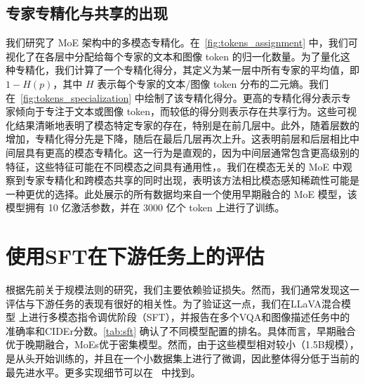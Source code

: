 \begin{figure}[t!]
    \begin{minipage}[t]{0.58\textwidth}
        
    \end{minipage}
    \hfill
    \begin{minipage}[t]{0.38\textwidth}
        
    \end{minipage}
\end{figure}
\subsection{专家专精化与共享的出现}  
\label{sec:specialization}  
我们研究了 MoE 架构中的多模态专精化。在~\cref{fig:tokens_assignment} 中，我们可视化了在各层中分配给每个专家的文本和图像 token 的归一化数量。为了量化这种专精化，我们计算了一个专精化得分，其定义为某一层中所有专家的平均值，即 $1-H(p)$，其中 $H$ 表示每个专家的文本/图像 token 分布的二元熵。我们在~\cref{fig:tokens_specialization} 中绘制了该专精化得分。更高的专精化得分表示专家倾向于专注于文本或图像 token，而较低的得分则表示存在共享行为。这些可视化结果清晰地表明了模态特定专家的存在，特别是在前几层中。此外，随着层数的增加，专精化得分先是下降，随后在最后几层再次上升。这表明前层和后层相比中间层具有更高的模态专精化。这一行为是直观的，因为中间层通常包含更高级别的特征，这些特征可能在不同模态之间具有通用性，。我们在模态无关的 MoE 中观察到专家专精化和跨模态共享的同时出现，表明该方法相比模态感知稀疏性可能是一种更优的选择。此处展示的所有数据均来自一个使用早期融合的 MoE 模型，该模型拥有 10 亿激活参数，并在 3000 亿个 token 上进行了训练。

  

\vspace{-1cm}
\section{使用SFT在下游任务上的评估}
根据先前关于规模法则的研究，我们主要依赖验证损失。然而，我们通常发现这一评估与下游任务的表现有很好的相关性。为了验证这一点，我们在LLaVA混合模型 \citep{liu2024improvedllava} 上进行多模态指令调优阶段（SFT），并报告在多个VQA和图像描述任务中的准确率和CIDEr分数。\cref{tab:sft} 确认了不同模型配置的排名。具体而言，早期融合优于晚期融合，MoEs优于密集模型。然而，由于这些模型相对较小（1.5B规模），是从头开始训练的，并且在一个小数据集上进行了微调，因此整体得分低于当前的最先进水平。更多实现细节可以在~ 中找到。

\begin{figure}[t!]
    \begin{minipage}[t]{0.58\textwidth}
        
    \end{minipage}
    \hfill
    \begin{minipage}[t]{0.38\textwidth}
        
    \end{minipage}
    \vspace{3mm}
\end{figure}
